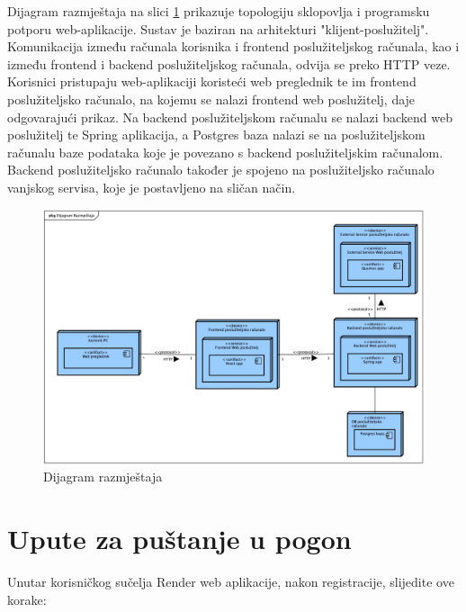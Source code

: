 			
			Dijagram razmještaja na slici \ref{fig:implementacija_dijagram_razmjestaja} prikazuje topologiju sklopovlja i programsku potporu web-aplikacije. Sustav je baziran na arhitekturi "klijent-poslužitelj". Komunikacija između računala korisnika i frontend poslužiteljskog računala, kao i između frontend i backend poslužiteljskog računala, odvija se preko HTTP veze. Korisnici pristupaju web-aplikaciji koristeći web preglednik te im frontend poslužiteljsko računalo, na kojemu se nalazi frontend web poslužitelj, daje odgovarajući prikaz. Na backend poslužiteljskom računalu se nalazi backend web poslužitelj te Spring aplikacija, a Postgres baza nalazi se na poslužiteljskom računalu baze podataka koje je povezano s backend poslužiteljskim računalom. Backend poslužiteljsko računalo također je spojeno na poslužiteljsko računalo vanjskog servisa, koje je postavljeno na sličan način.
			
			\begin{figure}[H]
				\includegraphics[scale=0.23]{slike/implementacija_dijagram_razmjestaja.jpg} %
				\centering
				\caption{Dijagram razmještaja}
				\label{fig:implementacija_dijagram_razmjestaja}
			\end{figure}
			
			\eject 
		
		\section{Upute za puštanje u pogon}
		
		Unutar korisničkog sučelja Render web aplikacije, nakon registracije, slijedite ove korake:
		
